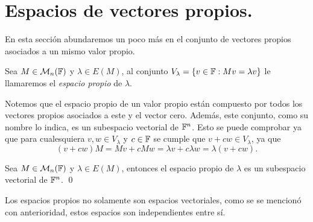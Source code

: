 \section{Espacios de vectores propios.}

En esta sección abundaremos un poco más en el conjunto de vectores propios asociados a un mismo valor propio.

\begin{defi}
  Sea $M \in \mathcal{M}_n(\mathbb{F})$ y $\lambda \in E(M)$, al conjunto $V_\lambda = \{v\in\mathbb{F} : Mv = \lambda v\}$ le llamaremos el \emph{espacio propio} de $\lambda$.
\end{defi}

Notemos que el espacio propio de un valor propio están compuesto por todos los vectores propios asociados a este y el vector cero. Además, este conjunto, como su nombre lo indica, es un subespacio vectorial de $\mathbb{F}^n$. Esto se puede comprobar ya que para cualesquiera $v,w \in V_\lambda$ y $c \in \mathbb{F}$ se cumple que $v+cw \in V_\lambda$, ya que
  \[
    (v+cw)M = Mv + cMw = \lambda v + c \lambda w = \lambda (v+cw).
  \]
\begin{prop}
  Sea $M \in \mathcal{M}_n(\mathbb{F})$ y $\lambda \in E(M)$, entonces el espacio propio de $\lambda$ es un subespacio vectorial de $\mathbb{F}^n$. \qed
\end{prop}

Los espacios propios no solamente son espacios vectoriales, como se se mencionó con anterioridad, estos espacios son independientes entre sí.

